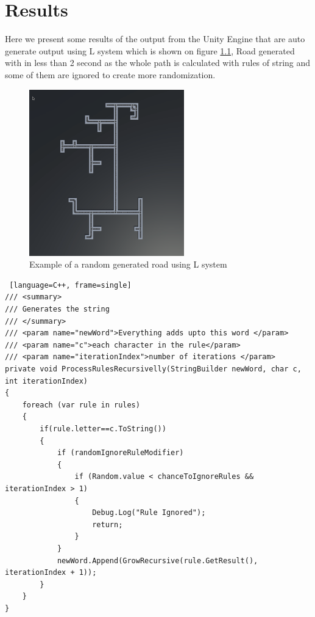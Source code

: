 \chapter{Results}


\Large Here we present some results of the output from the Unity Engine that are  auto generate output using L system which is shown on figure \ref{fig:road}, Road generated with in less than 2 second as the whole path is calculated with rules of string and some of them are ignored to create more randomization.

\begin{figure}[h]
\caption{Example of a random generated road using L system}
\label{fig:road}
\vspace{0.3cm}
\centering
\includegraphics[width=0.6\textwidth]{5. results/Road Outpu.png}
\end{figure}

\renewcommand{\baselinestretch}{1.5}
\begin{scriptsize}
\begin{lstlisting} [language=C++, frame=single]
/// <summary>
/// Generates the string 
/// </summary>
/// <param name="newWord">Everything adds upto this word </param>
/// <param name="c">each character in the rule</param>
/// <param name="iterationIndex">number of iterations </param>
private void ProcessRulesRecursivelly(StringBuilder newWord, char c, int iterationIndex)
{
    foreach (var rule in rules)
    {
        if(rule.letter==c.ToString())
        {
            if (randomIgnoreRuleModifier)
            {
                if (Random.value < chanceToIgnoreRules && iterationIndex > 1)
                {
                    Debug.Log("Rule Ignored");
                    return;
                }
            }
            newWord.Append(GrowRecursive(rule.GetResult(), iterationIndex + 1));
        }
    }
}
\end{lstlisting}

\end{scriptsize}

